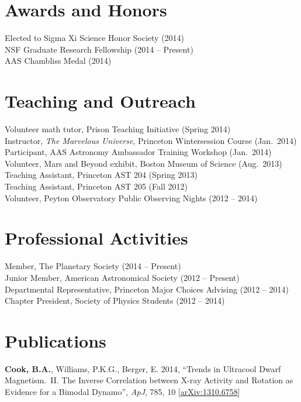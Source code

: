 \documentclass{res}
\begin{document}
\begin{resume}
\section{\textbf{Awards and Honors}}
\vspace{.1in}
Elected to Sigma Xi Science Honor Society (2014)\\
NSF Graduate Research Fellowship (2014 -- Present)\\
AAS Chambliss Medal (2014)


\section{\textbf{Teaching and Outreach}} 
\vspace{.1in}     
Volunteer math tutor, Prison Teaching Initiative (Spring 2014)\\
Instructor, \textit{The Marvelous Universe}, Princeton Wintersession Course (Jan.~2014)\\
Participant, AAS Astronomy Ambassador Training Workshop (Jan.~2014)\\
Volunteer, Mars and Beyond exhibit, Boston Museum of Science (Aug.~2013)\\
Teaching Assistant, Princeton AST 204 (Spring 2013)\\
Teaching Assistant, Princeton AST 205 (Fall 2012)\\
Volunteer, Peyton Observatory Public Observing Nights (2012
-- 2014)

\section{\textbf{Professional Activities}}
\vspace{0.1in}
Member, The Planetary Society (2014 -- Present)\\
Junior Member, American Astronomical Society (2012 -- Present)\\
Departmental Representative, Princeton Major Choices Advising (2012 -- 2014)\\
Chapter President, Society of Physics Students (2012 -- 2014)


\section{\textbf{Publications}}
\vspace{.1in} \textbf{Cook, B.A.}, Williams, P.K.G., Berger, E. 2014,
``Trends in Ultracool Dwarf Magnetism.~II. The Inverse Correlation
between X-ray Activity and Rotation as Evidence for a Bimodal
Dynamo'', \textit{ApJ}, 785, 10
[\href{http://arxiv.org/abs/1310.6758}{arXiv:1310.6758}]


\end{resume}
\end{document}
